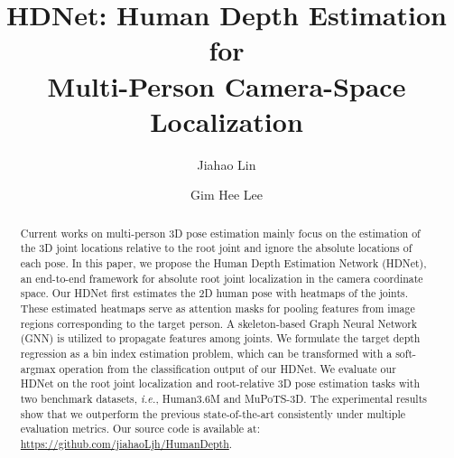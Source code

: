 \documentclass[runningheads]{llncs}
\begin{document}
\pagestyle{headings}
\mainmatter

\title{HDNet: Human Depth Estimation for\\Multi-Person Camera-Space Localization} 



\author{Jiahao Lin \and Gim Hee Lee}
\maketitle

\begin{abstract}
Current works on multi-person 3D pose estimation mainly focus on the estimation of the 3D joint locations relative to the root joint
and ignore the absolute locations of each pose. In this paper, we propose the Human Depth Estimation Network (HDNet), an end-to-end framework for absolute root joint localization in the camera coordinate space. Our HDNet first estimates the 2D human pose with heatmaps of the joints. These estimated heatmaps serve as attention masks for pooling features from image regions corresponding to the target person. A skeleton-based Graph Neural Network (GNN) is utilized to propagate features among joints. We formulate the target depth regression as a bin index estimation problem, which can be transformed with a soft-argmax operation from the classification output of our HDNet. We evaluate our HDNet on the root joint localization and root-relative 3D pose estimation tasks with two benchmark datasets, \textit{i.e.}, Human3.6M and MuPoTS-3D. The experimental results show that we outperform the previous state-of-the-art consistently under multiple evaluation metrics. Our source code is available at: \url{https://github.com/jiahaoLjh/HumanDepth}.
\end{abstract}
\end{document}
